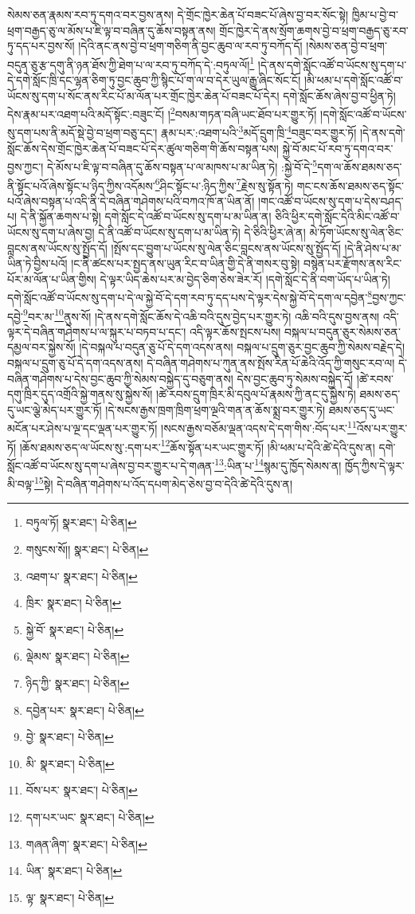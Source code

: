 སེམས་ཅན་རྣམས་རབ་ཏུ་དགའ་བར་བྱས་ནས། དེ་གྲོང་ཁྱེར་ཆེན་པོ་བཟང་པོ་ཞེས་བྱ་བར་སོང་སྟེ། ཁྱིམ་པ་བྱེ་བ་ཕྲག་བརྒྱད་ཅུ་ལ་མོས་པ་ཇི་ལྟ་བ་བཞིན་དུ་ཆོས་བསྟན་ནས། གྲོང་ཁྱེར་དེ་ནས་སྲོག་ཆགས་བྱེ་བ་ཕྲག་བརྒྱད་ཅུ་རབ་ཏུ་དད་པར་བྱས་སོ། །དེའི་ནང་ནས་བྱེ་བ་ཕྲག་གཅིག་ནི་བྱང་ཆུབ་ལ་རབ་ཏུ་བཀོད་དོ། །སེམས་ཅན་བྱེ་བ་ཕྲག་བདུན་ཅུ་རྩ་དགུ་ནི་ཉན་ཐོས་ཀྱི་ཐེག་པ་ལ་རབ་ཏུ་བཀོད་དེ་:བཏུལ་ལོ།\footnote{བཏུལ་ཏོ།  སྣར་ཐང་།  པེ་ཅིན། } །དེ་ནས་དགེ་སློང་འཚོ་བ་ཡོངས་སུ་དག་པ་དེ་དགེ་སློང་ཁྲི་དང་ལྷན་ཅིག་ཏུ་བྱང་ཆུབ་ཀྱི་སྙིང་པོ་ག་ལ་བ་དེར་ཡུལ་རྒྱུ་ཞིང་སོང་ངོ། །མི་ཕམ་པ་དགེ་སློང་འཚོ་བ་ཡོངས་སུ་དག་པ་སོང་ནས་རིང་པོ་མ་ལོན་པར་གྲོང་ཁྱེར་ཆེན་པོ་བཟང་པོ་དེར། དགེ་སློང་ཆོས་ཞེས་བྱ་བ་ཕྱིན་ཏེ། དེས་རྣམ་པར་འཐག་པའི་མདོ་སྟོང་:བཟུང་ངོ། །\footnote{གསུངས་སོ།།  སྣར་ཐང་།  པེ་ཅིན། }བསམ་གཏན་བཞི་ཡང་ཐོབ་པར་གྱུར་ཏོ། །དགེ་སློང་འཚོ་བ་ཡོངས་སུ་དག་པས་ནི་མདོ་སྡེ་བྱེ་བ་ཕྲག་བཅུ་དང་། རྣམ་པར་:འཐག་པའི་\footnote{འཐག་པ་  སྣར་ཐང་།  པེ་ཅིན། }མདོ་དྲུག་ཁྲི་\footnote{ཁྲིར་  སྣར་ཐང་།  པེ་ཅིན། }བཟུང་བར་གྱུར་ཏོ། །དེ་ནས་དགེ་སློང་ཆོས་དེས་གྲོང་ཁྱེར་ཆེན་པོ་བཟང་པོ་དེར་ཚུལ་གཅིག་གི་ཆོས་བསྟན་པས། སྐྱེ་བོ་མང་པོ་རབ་ཏུ་དགའ་བར་བྱས་ཀྱང་། དེ་མོས་པ་ཇི་ལྟ་བ་བཞིན་དུ་ཆོས་བསྟན་པ་ལ་མཁས་པ་མ་ཡིན་ཏེ། :སྐྱེ་བོ་དེ་\footnote{སྐྱེ་བོ་  སྣར་ཐང་།  པེ་ཅིན། }དག་ལ་ཆོས་ཐམས་ཅད་ནི་སྟོང་པའོ་ཞེས་སྟོང་པ་ཉིད་ཀྱིས་འདོམས་\footnote{ལྡེམས་  སྣར་ཐང་།  པེ་ཅིན། }ཤིང་སྟོང་པ་:ཉིད་ཀྱིས་\footnote{ཉིད་ཀྱི་  སྣར་ཐང་།  པེ་ཅིན། }རྗེས་སུ་སྟོན་ཏེ། གང་ངས་ཆོས་ཐམས་ཅད་སྟོང་པའོ་ཞེས་བསྟན་པ་འདི་ནི་དེ་བཞིན་གཤེགས་པའི་བཀའ་ཁོ་ན་ཡིན་ནོ། །གང་འཚོ་བ་ཡོངས་སུ་དག་པ་དེས་བཤད་པ། དེ་ནི་སྐྱོན་ཆགས་པ་སྟེ། དགེ་སློང་དེ་འཚོ་བ་ཡོངས་སུ་དག་པ་མ་ཡིན་ན། ཅིའི་ཕྱིར་དགེ་སློང་དེའི་མིང་འཚོ་བ་ཡོངས་སུ་དག་པ་ཞེས་བྱ། དེ་ནི་འཚོ་བ་ཡོངས་སུ་དག་པ་མ་ཡིན་ཏེ། དེ་ཅིའི་ཕྱིར་ཞེ་ན། མེ་ཏོག་ཡོངས་སུ་ལེན་ཅིང་བླངས་ནས་ཡོངས་སུ་སྤྱོད་དོ། །སྤོས་དང་བྱུག་པ་ཡོངས་སུ་ལེན་ཅིང་བླངས་ནས་ཡོངས་སུ་སྤྱོད་དོ། །དེ་ནི་ཤེས་པ་མ་ཡིན་ཏེ་བྱིས་པའོ། །ང་ནི་ཚངས་པར་སྤྱད་ནས་ཡུན་རིང་བ་ཡིན་གྱི་དེ་ནི་གསར་བུ་སྟེ། བསྙེན་པར་རྫོགས་ནས་རིང་པོར་མ་ལོན་པ་ཡིན་གྱིས། དེ་ལྟར་ཡིད་ཆེས་པར་མ་བྱེད་ཅིག་ཅེས་ཟེར་རོ། །དགེ་སློང་དེ་ནི་བག་ཡོད་པ་ཡིན་ཏེ། དགེ་སློང་འཚོ་བ་ཡོངས་སུ་དག་པ་དེ་ལ་སྐྱེ་བོ་དེ་དག་རབ་ཏུ་དད་པས་དེ་ལྟར་དེས་སྐྱེ་བོ་དེ་དག་ལ་དབྱེན་\footnote{དབྱེན་པར་  སྣར་ཐང་།  པེ་ཅིན། }བྱས་ཀྱང་དབྱེ་\footnote{བྱེ་  སྣར་ཐང་།  པེ་ཅིན། }བར་མ་\footnote{མི་  སྣར་ཐང་།  པེ་ཅིན། }ནུས་སོ། །དེ་ནས་དགེ་སློང་ཆོས་དེ་འཆི་བའི་དུས་བྱེད་པར་གྱུར་ཏེ། འཆི་བའི་དུས་བྱས་ནས། འདི་ལྟར་དེ་བཞིན་གཤེགས་པ་ལ་སྐུར་པ་བཏབ་པ་དང་། འདི་ལྟར་ཆོས་སྤངས་པས། བསྐལ་པ་བདུན་ཅུར་སེམས་ཅན་དམྱལ་བར་སྐྱེས་སོ། །དེ་བསྐལ་པ་བདུན་ཅུ་པོ་དེ་དག་འདས་ནས། བསྐལ་པ་དྲུག་ཅུར་བྱང་ཆུབ་ཀྱི་སེམས་བརྗེད་དེ། བསྐལ་པ་དྲུག་ཅུ་པོ་དེ་དག་འདས་ནས། དེ་བཞིན་གཤེགས་པ་ཀུན་ནས་སྤོས་རིན་པོ་ཆེའི་འོད་ཀྱི་གསུང་རབ་ལ། དེ་བཞིན་གཤེགས་པ་དེས་བྱང་ཆུབ་ཀྱི་སེམས་བསྐྱེད་དུ་བཅུག་ནས། དེས་བྱང་ཆུབ་ཏུ་སེམས་བསྐྱེད་དོ། །ཚེ་རབས་དགུ་ཁྲིར་དུད་འགྲོའི་སྐྱེ་གནས་སུ་སྐྱེས་སོ། །ཚེ་རབས་དྲུག་ཁྲིར་མི་དབུལ་པོ་རྣམས་ཀྱི་ནང་དུ་སྐྱེས་ཏེ། ཐམས་ཅད་དུ་ཡང་ལྕེ་མེད་པར་གྱུར་ཏོ། །དེ་སངས་རྒྱས་ཁྲག་ཁྲིག་ཕྲག་ལྔའི་གན་ན་ཆོས་སྨྲ་བར་གྱུར་ཏེ། ཐམས་ཅད་དུ་ཡང་མངོན་པར་ཤེས་པ་ལྔ་དང་ལྡན་པར་གྱུར་ཏོ། །སངས་རྒྱས་བཅོམ་ལྡན་འདས་དེ་དག་གིས་:བོད་པར་\footnote{བོས་པར་  སྣར་ཐང་།  པེ་ཅིན། }འོས་པར་གྱུར་ཏོ། །ཆོས་ཐམས་ཅད་ལ་ཡོངས་སུ་:དག་པར་\footnote{དག་པར་ཡང་  སྣར་ཐང་།  པེ་ཅིན། }ཆོས་སྟོན་པར་ཡང་གྱུར་ཏོ། །མི་ཕམ་པ་དེའི་ཚེ་དེའི་དུས་ན། དགེ་སློང་འཚོ་བ་ཡོངས་སུ་དག་པ་ཞེས་བྱ་བར་གྱུར་པ་དེ་གཞན་\footnote{གཞན་ཞིག་  སྣར་ཐང་།  པེ་ཅིན། }:ཡིན་པ་\footnote{ཡིན་  སྣར་ཐང་།  པེ་ཅིན། }སྙམ་དུ་ཁྱོད་སེམས་ན། ཁྱོད་ཀྱིས་དེ་ལྟར་མི་བལྟ་\footnote{ལྟ་  སྣར་ཐང་།  པེ་ཅིན། }སྟེ། དེ་བཞིན་གཤེགས་པ་འོད་དཔག་མེད་ཅེས་བྱ་བ་དེའི་ཚེ་དེའི་དུས་ན། 